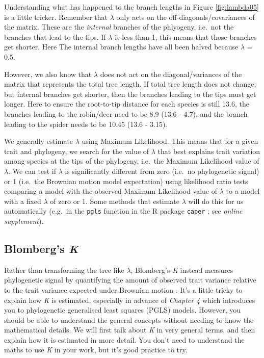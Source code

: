 \documentclass[]{book}
\begin{document}
Understanding what has happened to the branch lengths in Figure
\ref{fig:lambda05} is a little tricker. Remember that \(\lambda\) only
acts on the off-diagonals/covariances of the matrix. These are the
\emph{internal} branches of the phlyogeny, i.e.~not the branches that
lead to the tips. If \(\lambda\) is less than 1, this means that those
branches get shorter. Here The internal branch lengths have all been
halved because \(\lambda\) = 0.5.

However, we also know that \(\lambda\) does not act on the
diagonal/variances of the matrix that represents the total tree length.
If total tree length does not change, but internal branches get shorter,
then the branches leading to the tips must get longer. Here to ensure
the root-to-tip distance for each species is still 13.6, the branches
leading to the robin/deer need to be 8.9 (13.6 - 4.7), and the branch
leading to the spider needs to be 10.45 (13.6 - 3.15).

We generally estimate \(\lambda\) using Maximum Likelihood. This means
that for a given trait and phylogeny, we search for the value of
\(\lambda\) that best explains trait variation among species at the tips
of the phylogeny, i.e.~the Maximum Likelihood value of \(\lambda\). We
can test if \(\lambda\) is significantly different from zero (i.e.~no
phylogenetic signal) or 1 (i.e.~the Brownian motion model expectation)
using likelihood ratio tests comparing a model with the observed Maximum
Likelihood value of \(\lambda\) to a model with a fixed \(\lambda\) of
zero or 1. Some methods that estimate \(\lambda\) will do this for us
automatically (e.g.~in the \texttt{pgls} function in the R package
\texttt{caper} \citep{Orme:2013aa}; see \emph{online supplement}).

\subsection{\texorpdfstring{Blomberg's
\emph{K}}{Blomberg's K}}\label{blombergs-k}

Rather than transforming the tree like \(\lambda\), Blomberg's \emph{K}
instead measures phylogenetic signal by quantifying the amount of
observed trait variance relative to the trait variance expected under
Brownian motion \citep{blomberg2003testing}. It's a little tricky to
explain how \emph{K} is estimated, especially in advance of
\emph{Chapter 4} which introduces you to phylogenetic generalised least
squares (PGLS) models. However, you should be able to understand the
general concepts without needing to know the mathematical details. We
will first talk about \emph{K} in very general terms, and then explain
how it is estimated in more detail. You don't need to understand the
maths to use \emph{K} in your work, but it's good practice to try.
\end{document}
